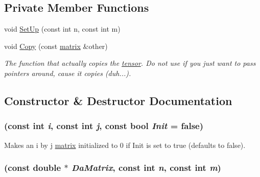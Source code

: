 \subsection*{Private Member Functions}
\begin{DoxyCompactItemize}
\item 
void \hyperlink{classJKBuilder_1_1matrix_a065caae828723eb0040120cb077780c5}{SetUp} (const int n, const int m)
\item 
void \hyperlink{classJKBuilder_1_1matrix_a75177328107f96ec679d43fce0a9e866}{Copy} (const \hyperlink{classJKBuilder_1_1matrix}{matrix} \&other)
\begin{DoxyCompactList}\small\item\em The function that actually copies the \hyperlink{classJKBuilder_1_1tensor}{tensor}. Do not use if you just want to pass pointers around, cause it copies (duh...). \item\end{DoxyCompactList}\end{DoxyCompactItemize}


\subsection{Constructor \& Destructor Documentation}
\hypertarget{classJKBuilder_1_1matrix_a7af07ab4ff5c2add0ae9bbf90c06c5d7}{
\subsubsection[{matrix}]{ (const int {\em i}, \/  const int {\em j}, \/  const bool {\em Init} = {\ttfamily false})}}
\label{classJKBuilder_1_1matrix_a7af07ab4ff5c2add0ae9bbf90c06c5d7}


Makes an i by j \hyperlink{classJKBuilder_1_1matrix}{matrix} initialized to 0 if Init is set to true (defaults to false). \hypertarget{classJKBuilder_1_1matrix_a89f63b8297dc93a94fb0d221521fce0e}{
\subsubsection[{matrix}]{ (const double $\ast$ {\em DaMatrix}, \/  const int {\em n}, \/  const int {\em m})}}
\label{classJKBuilder_1_1matrix_a89f63b8297dc93a94fb0d221521fce0e}


